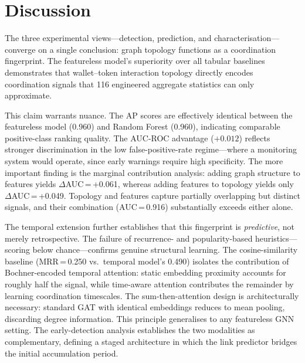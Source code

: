 \documentclass[10pt,journal]{IEEEtran}
\begin{document}
\section{Discussion}
\label{sec:discussion}

The three experimental views---detection, prediction, and
characterisation---converge on a single conclusion: graph topology
functions as a coordination fingerprint. The featureless model's
superiority over all tabular baselines demonstrates that wallet--token
interaction topology directly encodes coordination signals that 116
engineered aggregate statistics can only approximate.

This claim warrants nuance. The AP scores are effectively identical
between the featureless model (0.960) and Random Forest (0.960),
indicating comparable positive-class ranking quality. The AUC-ROC
advantage ($+0.012$) reflects stronger discrimination in the low
false-positive-rate regime---where a monitoring system would operate,
since early warnings require high specificity. The more important
finding is the marginal contribution analysis: adding graph structure
to features yields $\Delta$AUC\,=\,+0.061, whereas adding features to
topology yields only $\Delta$AUC\,=\,+0.049. Topology and features
capture partially overlapping but distinct signals, and their
combination (AUC\,=\,0.916) substantially exceeds either alone.

The temporal extension further establishes that this fingerprint is
\emph{predictive}, not merely retrospective. The failure of
recurrence- and popularity-based heuristics---scoring below
chance---confirms genuine structural learning. The cosine-similarity
baseline (MRR\,=\,0.250 vs.\ temporal model's 0.490) isolates the
contribution of Bochner-encoded temporal attention: static embedding
proximity accounts for roughly half the signal, while time-aware
attention contributes the remainder by learning coordination
timescales. The sum-then-attention design is architecturally necessary:
standard GAT with identical embeddings reduces to mean pooling,
discarding degree information. This principle generalises to any
featureless GNN setting. The early-detection analysis establishes the
two modalities as complementary, defining a staged architecture in
which the link predictor bridges the initial accumulation period.
\end{document}
